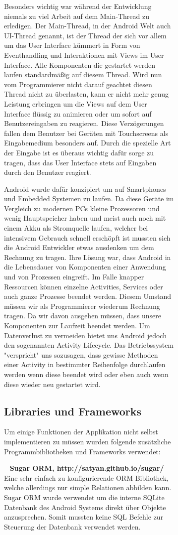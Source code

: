 \documentclass{scrartcl}
\begin{document}
\begin{figure}[!ht]
\begin{figure}[!ht]
Besonders wichtig war während der Entwicklung niemals zu viel Arbeit auf dem Main-Thread zu erledigen. Der Main-Thread, in der Android Welt auch UI-Thread genannt, ist der Thread der sich vor allem um das User Interface kümmert in Form von Eventhandling und Interaktionen mit Views im User Interface. Alle Komponenten die gestartet werden laufen standardmäßig auf diesem Thread. Wird nun vom Programmierer nicht darauf geachtet diesen Thread nicht zu überlasten, kann er nicht mehr genug Leistung erbringen um die Views auf dem User Interface flüssig zu animieren oder um sofort auf Benutzereingaben zu reagieren. Diese Verzögerungen fallen dem Benutzer bei Geräten mit Touchscreens als Eingabemedium besonders auf. Durch die spezielle Art der Eingabe ist es überaus wichtig dafür sorge zu tragen, dass das User Interface stets auf Eingaben durch den Benutzer reagiert. 

Android wurde dafür konzipiert um auf Smartphones und Embedded Systemen zu laufen. Da diese Geräte im Vergleich zu modernen PCs kleine Prozessoren und wenig Hauptspeicher haben und meist auch noch mit einem Akku als Stromquelle laufen, welcher bei intensivem Gebrauch schnell erschöpft ist mussten sich die Android Entwickler etwas ausdenken um dem Rechnung zu tragen.
Ihre Lösung war, dass Android in die Lebensdauer von Komponenten einer Anwendung und von Prozessen eingreift. Im Falle knapper Ressourcen können einzelne Activities, Services oder auch ganze Prozesse beendet werden. Diesem Umstand müssen wir als Programmierer wiederum Rechnung tragen. Da wir davon ausgehen müssen, dass unsere Komponenten zur Laufzeit beendet werden. Um Datenverlust zu vermeiden bietet uns Android jedoch den sogenannten Activity Lifecycle. Das Betriebssystem "verspricht" uns sozusagen, dass gewisse Methoden einer Activity in bestimmter Reihenfolge durchlaufen werden wenn diese beendet wird oder eben auch wenn diese wieder neu gestartet wird. 

\subsection{Libraries und Frameworks}
Um einige Funktionen der Applikation nicht selbst implementieren zu müssen
wurden folgende zusätzliche Programmbibliotheken und Frameworks verwendet:

\noindent
\ \newline
\textbf{Sugar ORM, http://satyan.github.io/sugar/} \newline
Eine sehr einfach zu konfigurierende ORM Bibliothek, welche allerdings nur
simple Relationen abbilden kann. Sugar ORM wurde verwendet um die interne SQLite
Datenbank des Android Systems direkt über Objekte anzusprechen. Somit mussten
keine SQL Befehle zur Steuerung der Datenbank verwendet werden.


\end{figure}
\end{figure}
\end{document}
